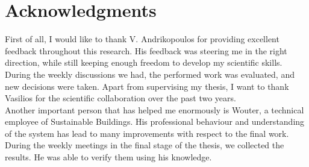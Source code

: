 



\bigskip

\begingroup
\let\clearpage\relax
\let\cleardoublepage\relax
\let\cleardoublepage\relax
\chapter*{Acknowledgments}
First of all, I would like to thank V. Andrikopoulos for providing excellent feedback throughout this research. His feedback was steering me in the right direction, while still keeping enough freedom to develop my scientific skills. During the weekly discussions we had, the performed work was evaluated, and new decisions were taken. Apart from supervising my thesis, I want to thank Vasilios for the scientific collaboration over the past two years.\\

\noindent
Another important person that has helped me enormously is Wouter, a technical employee of Sustainable Buildings. His professional behaviour and understanding of the system has lead to many improvements with respect to the final work. During the weekly meetings in the final stage of the thesis, we collected the results. He was able to verify them using his knowledge.


\endgroup
